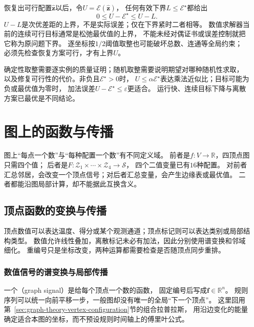 恢复出可行配置\(\widehat{\bm z}\)以后，令\(U=\mathcal E(\widehat{\bm z})\)，
任何有效下界\(L\leq\mathcal E^\star\)都给出
\[
  0\leq U-\mathcal E^\star\leq U-L.
\]
\(U-L\)是次优差距的上界，不是实际误差；仅在下界紧时二者相等。
数值求解器当前的连续可行目标通常是松弛最优值的上界，
不能未经对偶证书或误差控制就把它称为原问题下界。
逐坐标按\(1/2\)阈值取整也可能破坏总数、连通等全局约束；
必须先检查恢复方案可行，才有上界\(U\)。

确定性取整需要逐实例的质量证明；随机取整需要说明期望对哪种随机性求取，
以及修复可行性的代价。非负且\(\mathcal E^\star>0\)时，
\(U\leq\alpha\mathcal E^\star\)表达乘法近似比；目标可能为负或最优值为零时，
加法误差\(U-\mathcal E^\star\leq\varepsilon\)更适合。
运行快、连续目标下降与离散方案已最优是不同结论。

\section{图上的函数与传播}
\label{sec:graph-theory-functions-propagation}

图上“每点一个数”与“每种配置一个数”有不同定义域。
前者是\(f:V\to\mathbb R\)，四顶点图只需四个值；
后者是\(F:\mathcal Z_1\times\cdots\times\mathcal Z_4\to\mathcal S\)，
四个二值变量已有\(16\)种配置。
对前者汇总邻居，会改变一个顶点信号；对后者汇总变量，会产生边缘表或最优值。
二者都能沿图局部计算，却不能据此互换含义。

\subsection{顶点函数的变换与传播}
\label{sec:graph-theory-vertex-functions}
\label{sec:graph-theory-structure-comparison}

顶点数值可以表达温度、得分或某个观测通道；顶点标记则可以表达类别或局部结构类型。
数值允许线性叠加，离散标记未必有加法，因此分别使用谱变换和邻域细化。
重编号只是坐标改变，两种运算都需要检查是否随顶点同步重排。

\subsubsection{数值信号的谱变换与局部传播}
\label{sec:signal-analysis-graph-state-kernels}

一个（graph signal）是给每个顶点一个数的函数，
固定编号后写成\(\bm f\in\mathbb R^n\)。
规则序列可以统一向前平移一步，一般图却没有唯一的全局“下一个顶点”。
这里回用第~\ref{sec:graph-theory-vertex-configuration}节的组合拉普拉斯，
用沿边变化的能量确定适合本图的坐标，而不预设规则时间轴上的傅里叶公式。

